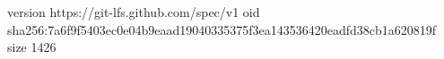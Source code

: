 version https://git-lfs.github.com/spec/v1
oid sha256:7a6f9f5403ec0e04b9eaad19040335375f3ea143536420eadfd38cb1a620819f
size 1426
